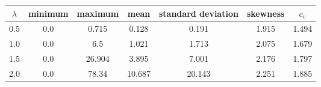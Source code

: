 \begin{tabular}{ccccccc}
  \toprule
  \textbf{\(\lambda\)} & \textbf{minimum} & \textbf{maximum} & \textbf{mean} & \textbf{standard deviation} & \textbf{skewness} & \textbf{\(c_v\)} \\\midrule
  0.5 & 0.0 & 0.715 & 0.128 & 0.191 & 1.915 & 1.494 \\
  1.0 & 0.0 & 6.5 & 1.021 & 1.713 & 2.075 & 1.679 \\
  1.5 & 0.0 & 26.904 & 3.895 & 7.001 & 2.176 & 1.797 \\
  2.0 & 0.0 & 78.34 & 10.687 & 20.143 & 2.251 & 1.885 \\\bottomrule
\end{tabular}
